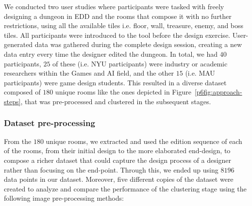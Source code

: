 We conducted two user studies where participants were tasked with freely designing a dungeon in EDD and the rooms that compose it with no further restrictions, using all the available tiles i.e. floor, wall, treasure, enemy, and boss tiles. All participants were introduced to the tool before the design exercise. User-generated data was gathered during the complete design session, creating a new data entry every time the designer edited the dungeon. In total, we had $40$ participants, $25$ of these (i.e. NYU participants) were industry or academic researchers within the Games and AI field, and the other $15$ (i.e. MAU participants) were game design students. This resulted in a diverse dataset composed of $180$ unique rooms like the ones depicted in Figure~\ref{p6fig:approach-steps}, that was pre-processed and clustered in the subsequent stages. 

\subsubsection{Dataset pre-processing}

From the $180$ unique rooms, we extracted and used the edition sequence of each of the rooms, from their initial design to the more elaborated end-design, to compose a richer dataset that could capture the design process of a designer rather than focusing on the end-point. Through this, we ended up using $8196$ data points in our dataset.
Moreover, five different copies of the dataset were created to analyze and compare the performance of the clustering stage using the following image pre-processing methods:

